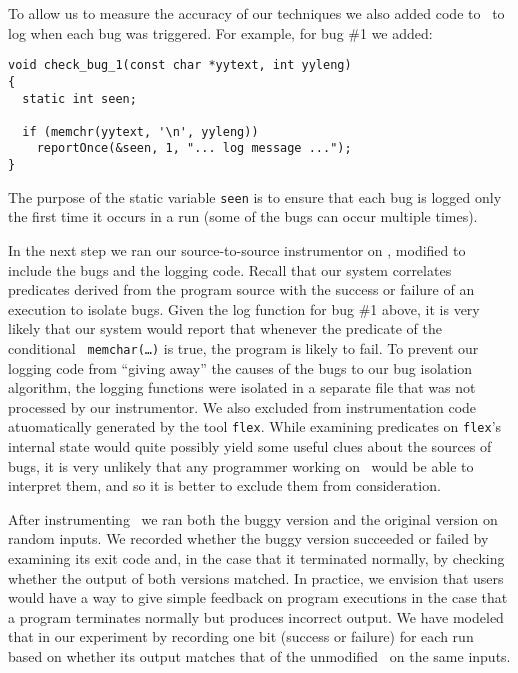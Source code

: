 To allow us to measure the accuracy of our techniques we also added code to \moss\ to 
log when each bug was triggered.  For example, for bug \#1 we added:
\begin{verbatim}
void check_bug_1(const char *yytext, int yyleng)
{
  static int seen;

  if (memchr(yytext, '\n', yyleng))
    reportOnce(&seen, 1, "... log message ...");
}
\end{verbatim}
The purpose of the static variable {\tt seen} is to ensure that each bug is logged only the first time
it occurs in a run (some of the bugs can occur multiple times).  

In the next step we ran our source-to-source instrumentor on \moss,
modified to include the bugs and the logging code.  Recall that our
system correlates predicates derived from the program source with the
success or failure of an execution to isolate bugs.  Given the log
function for bug \#1 above, it is very likely that our system would
report that whenever the predicate of the conditional {\tt
memchar(\ldots)} is true, the program is likely to fail.  To prevent
our logging code from ``giving away'' the causes of the bugs to our
bug isolation algorithm, the logging functions were isolated in a
separate file that was not processed by our instrumentor.  We also
excluded from instrumentation code atuomatically generated by the tool
{\tt flex}.  While examining predicates on {\tt flex}'s internal state
would quite possibly yield some useful clues about the sources of
bugs, it is very unlikely that any programmer working on \moss\ would
be able to interpret them, and so it is better to exclude them from
consideration.

After instrumenting \moss\ we ran both the buggy version and the
original version on random inputs. We recorded whether the buggy
version succeeded or failed by examining its exit code and, in the
case that it terminated normally, by checking whether the output of
both versions matched.  In practice, we envision that users would have
a way to give simple feedback on program executions in the case that a
program terminates normally but produces incorrect output.  We have
modeled that in our experiment by recording one bit (success or
failure) for each run based on whether its output matches that of the
unmodified \moss\ on the same inputs.

